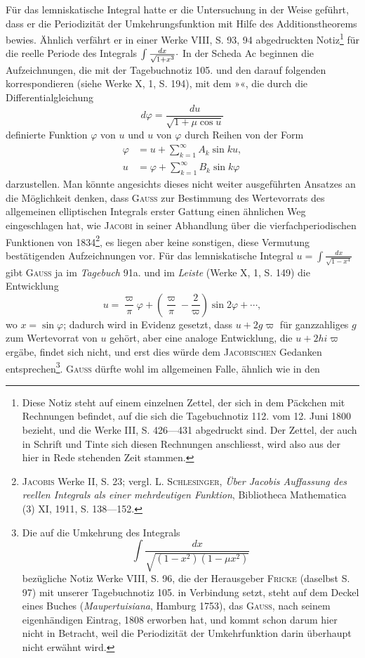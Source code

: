 Für das lemniskatische Integral hatte er die Untersuchung in der Weise
geführt, dass er die Periodizität der Umkehrungsfunktion mit Hilfe des Additionstheorems bewies. Ähnlich verfährt er in einer Werke VIII, S. 93, 94
abgedruckten Notiz\footnote{Diese Notiz steht auf einem einzelnen Zettel, der sich in dem Päckchen mit Rechnungen befindet, auf die sich die Tagebuchnotiz 112. vom 12. Juni 1800 bezieht, und die Werke III, S. 426—431 abgedruckt sind. Der Zettel, der auch in Schrift und Tinte sich diesen Rechnungen anschliesst, wird also aus der hier in Rede stehenden Zeit stammen.} für die reelle Periode des Integrals \(\int\frac{dx}{\sqrt{1+x^3}}\mathpunct{\vcenter{\hbox{.}}}\) In der
Scheda Ac beginnen die Aufzeichnungen, die mit der Tagebuchnotiz 105. und
den darauf folgenden korrespondieren (siehe Werke X, 1, S. 194), mit dem
»«, die durch die Differentialgleichung
\[
d\varphi=\frac{du}{\sqrt{1+\mu\cos u}}
\]
\noindent definierte Funktion \(\varphi\) von \(u\) und \(u\) von \(\varphi\) durch Reihen von der Form
\[
\begin{aligned}
\varphi&=u+\sum_{k=1}^{\infty}A_k\sin ku,\\[1ex]
u&=\varphi+\sum_{k=1}^{\infty}B_k\sin k\varphi
\end{aligned}
\]
\noindent darzustellen. Man könnte angesichts dieses nicht weiter ausgeführten Ansatzes an die Möglichkeit denken, dass \textsc{Gauss} zur Bestimmung des Wertevorrats des allgemeinen elliptischen Integrals erster Gattung einen ähnlichen
Weg eingeschlagen hat, wie \textsc{Jacobi} in seiner Abhandlung über die vierfachperiodischen Funktionen von 1834\footnote{\textsc{Jacobis} Werke II, S. 23; vergl. L. \textsc{Schlesinger}, \textit{Über Jacobis Auffassung des reellen Integrals als einer mehrdeutigen Funktion}, Bibliotheca Mathematica (3) XI, 1911, S. 138—152.}, es liegen aber keine sonstigen, diese
Vermutung bestätigenden Aufzeichnungen vor. Für das lemniskatische Integral \(u=\int\frac{dx}{\sqrt{1-x^4}}\) gibt \textsc{Gauss} ja im \textit{Tagebuch} 91a. und im \textit{Leiste} (Werke X, 1,
S. 149) die Entwicklung
\[
u=\frac\varpi\pi\varphi+\left(\frac\varpi\pi-\frac2\varpi\right)\sin2\varphi+\cdots,
\]
\clearpage{}
\noindent wo \(x=\sin\varphi\); dadurch wird in Evidenz gesetzt, dass \(u+2g\varpi\) für ganzzahliges
\(g\) zum Wertevorrat von \(u\) gehört, aber eine analoge Entwicklung, die \(u+2hi\varpi\)
ergäbe, findet sich nicht, und erst dies würde dem \textsc{Jacobischen} Gedanken entsprechen\footnote{Die auf die Umkehrung des Integrals
\[
\int\frac{dx}{\sqrt{(1-x^2)(1-\mu x^2)}}
\]
bezügliche Notiz Werke VIII, S. 96, die der Herausgeber \textsc{Fricke} (daselbst S. 97) mit unserer Tagebuchnotiz 105. in Verbindung setzt, steht auf dem Deckel eines Buches (\textit{Maupertuisiana}, Hamburg 1753), das \textsc{Gauss}, nach seinem eigenhändigen Eintrag, 1808 erworben hat, und kommt schon darum hier nicht in Betracht, weil die Periodizität der Umkehrfunktion darin überhaupt nicht erwähnt wird.}. \textsc{Gauss} dürfte wohl im allgemeinen Falle, ähnlich wie in den
